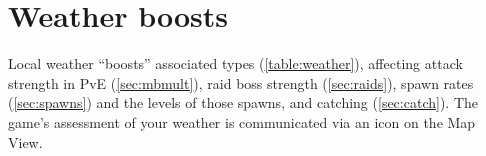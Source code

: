 \section{Weather boosts\label{sec:weather}}
Local weather ``boosts'' associated types (\autoref{table:weather}),
  affecting attack strength in PvE (\autoref{sec:mbmult}),
  raid boss strength (\autoref{sec:raids}),
  spawn rates (\autoref{sec:spawns}) and the levels of those spawns,
  and catching (\autoref{sec:catch}).
The game's assessment of your weather is communicated via an icon on the Map View.
\begin{table}

\end{table}
